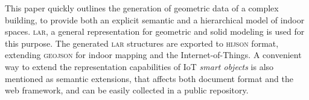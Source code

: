 \documentclass[11pt,oneside,A4]{amsart}   	%
\begin{document}
This paper quickly outlines the generation of geometric data of a complex building, to provide both an explicit semantic and a hierarchical model of indoor spaces. \textsc{\large lar}, a general representation for geometric and solid modeling is used for this purpose. The generated \textsc{\large lar} structures are exported to \textsc{\large hijson} format, extending \textsc{\large geojson} for indoor mapping and the Internet-of-Things. A convenient way to extend the representation capabilities of IoT \emph{smart objects} is also mentioned as semantic extensions, that affects both document format and the web framework, and can be easily collected in a public repository.
\end{document}
